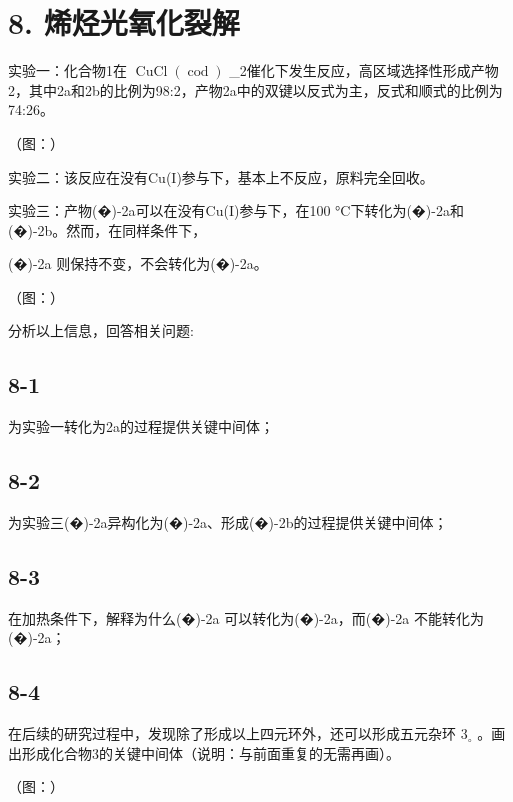 \section*{8. 烯烃光氧化裂解}
实验⼀：化合物1在 $\operatorname { C u C l } ( \operatorname { c o d } )$ _{2}催化下发⽣反应，⾼区域选择性形成产物2，其中2a和2b的⽐例为98:2，产物2a中的双键以反式为主，反式和顺式的⽐例为74:26。

（图：）

实验⼆：该反应在没有Cu(I)参与下，基本上不反应，原料完全回收。

实验三：产物(�)-2a可以在没有Cu(I)参与下，在100 °C下转化为(�)-2a和(�)-2b。然⽽，在同样条件下，

(�)-2a 则保持不变，不会转化为(�)-2a。

（图：）

分析以上信息，回答相关问题:

\subsection*{8-1}
为实验⼀转化为2a的过程提供关键中间体；

\subsection*{8-2}
为实验三(�)-2a异构化为(�)-2a、形成(�)-2b的过程提供关键中间体；

\subsection*{8-3}
在加热条件下，解释为什么(�)-2a 可以转化为(�)-2a，⽽(�)-2a 不能转化为(�)-2a；

\subsection*{8-4}
在后续的研究过程中，发现除了形成以上四元环外，还可以形成五元杂环 $3 _ { \circ }$ 。画出形成化合物3的关键中间体（说明：与前⾯重复的⽆需再画）。

（图：）
